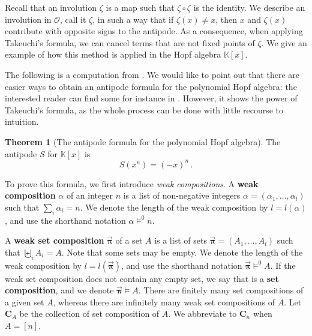 \documentclass[12pt, reqno]{amsart}
\theoremstyle{definition}
\newtheorem{thm}{Theorem}[section]
\newcommand{\opi}{\vec{\boldsymbol{\pi}}}
\begin{document}
Recall that an involution $\zeta $ is a map such that $\zeta \circ \zeta$ is the identity.
We describe an involution in $\mathcal O$, call it $\zeta $, in such a way that if $\zeta(x) \neq x$, then $x$ and $\zeta(x)$ contribute with opposite signs to the antipode.
As a consequence, when applying Takeuchi's formula, we can cancel terms that are not fixed points of $\zeta$.
We give an example of how this method is applied in the Hopf algebra $\mathbb{K}[x]$.

The following is a computation from \cite{BS2017}.
We would like to point out that there are easier ways to obtain an antipode formula for the polynomial Hopf algebra: the interested reader can find some for instance in \cite{GrinbergReiner}.
However, it shows the power of Takeuchi’s formula, as the whole process can be done with little recourse to intuition.


\begin{thm}[The antipode formula for the polynomial Hopf algebra]\label{thm:polyHA}
The antipode $S$ for $\mathbb{K}[x] $ is 
$$ S(x^n) =(-x)^n\, . $$
\end{thm}

To prove this formula, we first introduce \textit{weak compositions}.
A \textbf{weak composition} $\alpha$ of an integer $n$ is a list of non-negative integers $\alpha = (\alpha_1, \dots , \alpha_l)$ such that $\sum_i \alpha_i = n$.
We denote the length of the weak composition by $l = l(\alpha)$, and use the shorthand notation $\alpha \models^0 n$.

A \textbf{weak set composition} $\opi$ of a set $A$ is a list of sets $\opi = (A_1, \dots , A_l)$ such that $\biguplus_i A_i = A$.
Note that some sets may be empty.
We denote the length of the weak composition by $l= l(\opi)$, and use the shorthand notation $\opi \models^0 A$.
If the weak set composition does not contain any empty set, we say that is a \textbf{set composition}, and we denote $\opi \models A$.
There are finitely many set compositions of a given set $A$, whereas there are infinitely many weak set compositions of $A$.
Let $\mathbf{C}_A$ be the collection of set composition of $A$.
We abbreviate to $\mathbf{C}_n$ when $A = [n]$.
\end{document}
